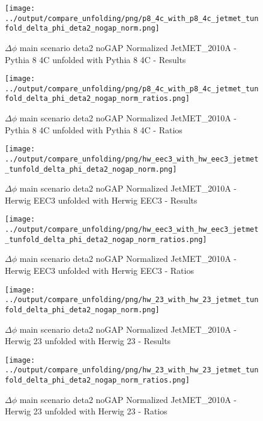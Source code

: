 \documentclass[11pt]{book}
\begin{document}
\begin{figure}[ht]
\centering
\texttt{[image: ../output/compare\_unfolding/png/p8\_4c\_with\_p8\_4c\_jetmet\_tunfold\_delta\_phi\_deta2\_nogap\_norm.png]}
\caption{$\Delta\phi$ main scenario deta2 noGAP Normalized JetMET\_2010A - Pythia 8 4C unfolded with Pythia 8 4C - Results}
\label{p8_p8_jetmet_tunfold_delta_phi_deta2_nogap_norm_a}
\end{figure}

\begin{figure}[ht]
\centering
\texttt{[image: ../output/compare\_unfolding/png/p8\_4c\_with\_p8\_4c\_jetmet\_tunfold\_delta\_phi\_deta2\_nogap\_norm\_ratios.png]}
\caption{$\Delta\phi$ main scenario deta2 noGAP Normalized JetMET\_2010A - Pythia 8 4C unfolded with Pythia 8 4C - Ratios}
\label{p8_p8_jetmet_tunfold_delta_phi_deta2_nogap_norm_b}
\end{figure}

\begin{figure}[ht]
\centering
\texttt{[image: ../output/compare\_unfolding/png/hw\_eec3\_with\_hw\_eec3\_jetmet\_tunfold\_delta\_phi\_deta2\_nogap\_norm.png]}
\caption{$\Delta\phi$ main scenario deta2 noGAP Normalized JetMET\_2010A - Herwig EEC3 unfolded with Herwig EEC3 - Results}
\label{hw_eec3_hw_eec3_jetmet_tunfold_delta_phi_deta2_nogap_norm_a}
\end{figure}

\begin{figure}[ht]
\centering
\texttt{[image: ../output/compare\_unfolding/png/hw\_eec3\_with\_hw\_eec3\_jetmet\_tunfold\_delta\_phi\_deta2\_nogap\_norm\_ratios.png]}
\caption{$\Delta\phi$ main scenario deta2 noGAP Normalized JetMET\_2010A - Herwig EEC3 unfolded with Herwig EEC3 - Ratios}
\label{hw_eec3_hw_eec3_jetmet_tunfold_delta_phi_deta2_nogap_norm_b}
\end{figure}

\begin{figure}[ht]
\centering
\texttt{[image: ../output/compare\_unfolding/png/hw\_23\_with\_hw\_23\_jetmet\_tunfold\_delta\_phi\_deta2\_nogap\_norm.png]}
\caption{$\Delta\phi$ main scenario deta2 noGAP Normalized JetMET\_2010A - Herwig 23 unfolded with Herwig 23 - Results}
\label{hw_23_hw_23_jetmet_tunfold_delta_phi_deta2_nogap_norm_a}
\end{figure}

\begin{figure}[ht]
\centering
\texttt{[image: ../output/compare\_unfolding/png/hw\_23\_with\_hw\_23\_jetmet\_tunfold\_delta\_phi\_deta2\_nogap\_norm\_ratios.png]}
\caption{$\Delta\phi$ main scenario deta2 noGAP Normalized JetMET\_2010A - Herwig 23 unfolded with Herwig 23 - Ratios}
\label{hw_23_hw_23_jetmet_tunfold_delta_phi_deta2_nogap_norm_b}
\end{figure}
\end{document}
